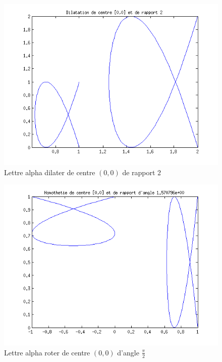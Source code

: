 \documentclass[a4paper,10pt]{report}
\begin{document}
\begin{figure}[h]
	\begin{center}
		\includegraphics[scale=0.7]{dilate}
		\caption{Lettre alpha dilater de centre $(0, 0)$ de rapport 2}
	\end{center}
\end{figure}

\begin{figure}[h]
	\begin{center}
		\includegraphics[scale=0.7]{rotate}
		\caption{Lettre alpha roter de centre $(0, 0)$ d'angle $\frac{\pi}{2}$}
	\end{center}
\end{figure}
\end{document}
